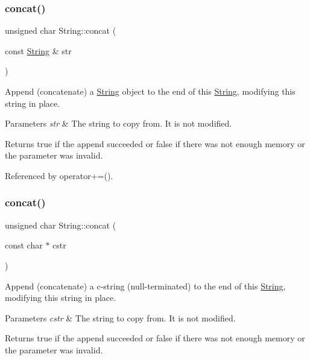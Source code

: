 \subsubsection{\texorpdfstring{concat()}{concat()}\hspace{0.1cm}{\footnotesize\ttfamily [1/12]}}
{\footnotesize\ttfamily unsigned char String\+::concat (\begin{DoxyParamCaption}\item[{const \hyperlink{class_string}{String} \&}]{str }\end{DoxyParamCaption})}



Append (concatenate) a \hyperlink{class_string}{String} object to the end of this \hyperlink{class_string}{String}, modifying this string in place. 


\begin{DoxyParams}{Parameters}
{\em str} & The string to copy from. It is not modified.\\
\hline
\end{DoxyParams}
\begin{DoxyReturn}{Returns}
true if the append succeeded or false if there was not enough memory or the parameter was invalid. 
\end{DoxyReturn}


Referenced by operator+=().

\mbox{\label{class_string_a5477edc378d55f57bb6572217e562c7a}} 
\subsubsection{\texorpdfstring{concat()}{concat()}\hspace{0.1cm}{\footnotesize\ttfamily [2/12]}}
{\footnotesize\ttfamily unsigned char String\+::concat (\begin{DoxyParamCaption}\item[{const char $\ast$}]{cstr }\end{DoxyParamCaption})}



Append (concatenate) a c-\/string (null-\/terminated) to the end of this \hyperlink{class_string}{String}, modifying this string in place. 


\begin{DoxyParams}{Parameters}
{\em cstr} & The string to copy from. It is not modified.\\
\hline
\end{DoxyParams}
\begin{DoxyReturn}{Returns}
true if the append succeeded or false if there was not enough memory or the parameter was invalid. 
\end{DoxyReturn}


